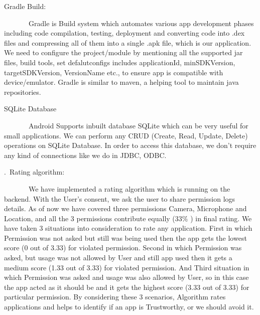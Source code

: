 \documentclass[12pt]{report}
\renewcommand{\_}{\kern-1.5pt\textunderscore\kern-1.5pt}
\begin{document}
\begin{multicols}{2}
\begin{justify}
\end{justify}
\begin{justify}
{\fontsize{10pt}{12.0pt} Gradle Build:}
\end{justify}
\begin{justify}
{\fontsize{10pt}{12.0pt}\selectfont \ \ \ \ \ \ \  \tab Gradle is Build system which automates various app development phases including code compilation, testing, deployment and converting code into .dex files and compressing all of them into a single .apk file, which is our application. We need to configure the project/module by mentioning all the supported jar files, build tools, set defalutconfigs includes applicationId, minSDKVersion, targetSDKVersion, VersionName etc., to ensure app is compatible with device/emulator. Gradle is similar to maven, a helping tool to maintain java repositories.\par}
\end{justify}
\begin{justify}
{\fontsize{10pt}{12.0pt} SQLite Database}
\end{justify}
\begin{justify}
{\fontsize{10pt}{12.0pt}\selectfont \ \ \ \ \ \ \  \tab Android Supports inbuilt database SQLite which can be very useful for small applications. We can perform any CRUD (Create, Read, Update, Delete) operations on SQLite Database. In order to access this database, we don’t require any kind of connections like we do in JDBC, ODBC.\par}
\end{justify}
\begin{justify}
{\fontsize{10pt}{12.0pt}.\  Rating algorithm:}
\end{justify}
\begin{justify}
{\fontsize{10pt}{12.0pt}\selectfont \ \ \ \ \ \ \  \tab We have implemented a rating algorithm which is running on the backend. With the User’s consent, we ask the user to share permission logs details. As of now we have covered three permissions Camera, Microphone and Location, and all the 3 permissions contribute equally (33$\%$ ) in final rating. We have taken 3 situations into consideration to rate any application. First in which Permission was not asked but still was being used then the app gets the lowest score (0 out of 3.33) for violated permission. Second in which Permission was asked, but usage was not allowed by User and still app used then it gets a medium score (1.33 out of 3.33) for violated permission. And Third situation in which Permission was asked and usage was also allowed by User, so in this case the app acted as it should be and it gets the highest score (3.33 out of 3.33) for particular permission. By considering these 3 scenarios, Algorithm rates applications and helps to identify if an app is Trustworthy, or we should avoid it.\par}

\end{justify}
\end{multicols}
\end{document}
